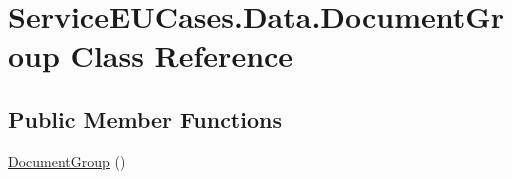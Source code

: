 \hypertarget{class_service_e_u_cases_1_1_data_1_1_document_group}{\section{Service\-E\-U\-Cases.\-Data.\-Document\-Group Class Reference}
\label{class_service_e_u_cases_1_1_data_1_1_document_group}
}
\subsection*{Public Member Functions}
\begin{DoxyCompactItemize}
\item 
\hyperlink{class_service_e_u_cases_1_1_data_1_1_document_group_aaa30391421338558776fa6782594e94b}{Document\-Group} ()
\end{DoxyCompactItemize}
